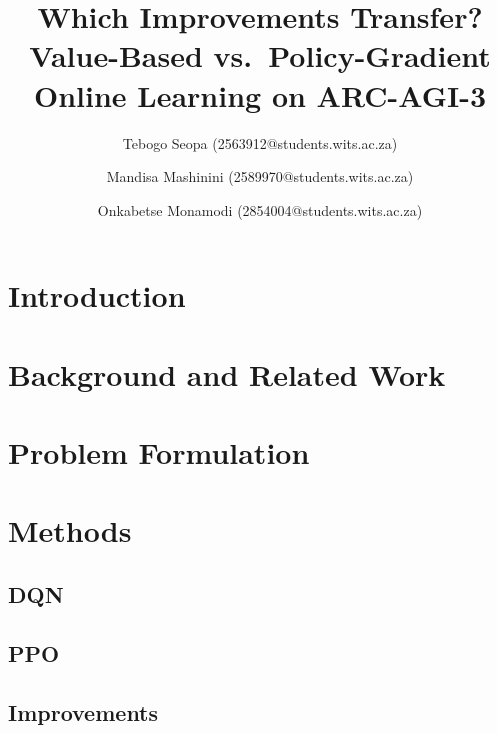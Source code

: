 \documentclass{article}
\title{Which Improvements Transfer? Value-Based vs.\ Policy-Gradient Online Learning on ARC-AGI-3}
\author{Tebogo Seopa (2563912@students.wits.ac.za) \and Mandisa Mashinini (2589970@students.wits.ac.za)
  \and Onkabetse Monamodi (2854004@students.wits.ac.za)}
\begin{document}
\maketitle

\begin{abstract}
\end{abstract}

\section{Introduction}

\section{Background and Related Work}

\section{Problem Formulation}

\section{Methods}
\subsection{DQN}
\subsection{PPO}
\subsection{Improvements}
\end{document}
